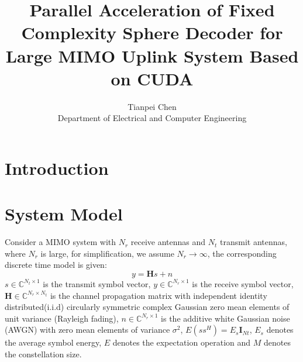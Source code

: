 \documentclass[12pt,a4paper,final]{article}
\title{Parallel Acceleration of Fixed Complexity Sphere Decoder for Large MIMO Uplink System Based on CUDA}
\author{Tianpei Chen\\
 Department of Electrical and Computer Engineering\\}
\begin{document}
\begin{spacing}{2.5}
\maketitle







%

\section{Introduction}

\section{System Model}\label{system}
Consider a MIMO system with $N_r$ receive antennas and $N_t$ transmit antennas, where $N_r$ is large, for simplification, we assume $N_r\to\infty$, the corresponding discrete time model is given:
\begin{equation}
y=\mathbf{H}s+n
\end{equation}
$s\in \mathbb{C}^{N_{t}\times 1}$ is the transmit symbol vector, $y\in \mathbb{C}^{N_{r}\times 1}$ is the receive symbol vector, $\mathbf{H}\in \mathbb{C}^{N_{r}\times N_{t}}$ is the channel propagation matrix with independent identity distributed(i.i.d) circularly symmetric complex Gaussian zero mean elements of unit variance (Rayleigh fading), $n\in \mathbb{C}^{N_{r}\times 1}$ is the additive white Gaussian noise (AWGN) with zero mean elements of variance $\sigma^{2}$, $E(ss^{H})=E_{s}\mathbf{I}_{Nt}$, $E_s$ denotes the average symbol energy, $E$ denotes the expectation operation and $M$ denotes the constellation size. 



\end{spacing}
\end{document}
